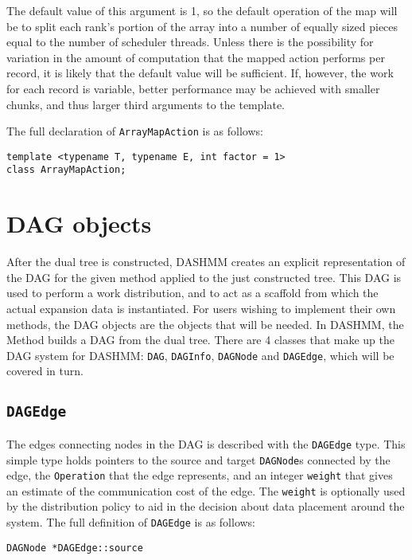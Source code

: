 The default value of this argument is 1, so the default operation of
the map will be to split each rank's portion of the array into a number of
equally sized pieces equal to the number of scheduler threads. Unless there is
the possibility for variation in the amount of computation that the mapped
action performs per record, it is likely that the default value will be
sufficient. If, however, the work for each record is variable, better
performance may be achieved with smaller chunks, and thus larger third arguments
to the template.

The full declaration of \texttt{ArrayMapAction} is as follows:


\begin{lstlisting}
template <typename T, typename E, int factor = 1>
class ArrayMapAction;
\end{lstlisting}



\section{DAG objects}

After the dual tree is constructed, DASHMM creates an explicit representation
of the DAG for the given method applied to the just constructed tree. This DAG
is used to perform a work distribution, and to act as a scaffold from which
the actual expansion data is instantiated. For users wishing to implement
their own methods, the DAG objects are the objects that will be needed. In
DASHMM, the Method builds a DAG from the dual tree. There are 4 classes that
make up the DAG system for DASHMM: \texttt{DAG}, \texttt{DAGInfo},
\texttt{DAGNode} and \texttt{DAGEdge}, which will be covered in turn.

\subsection{\texttt{DAGEdge}}

The edges connecting nodes in the DAG is described with the \texttt{DAGEdge}
type. This simple type holds pointers to the source and target
\texttt{DAGNode}s connected by the edge, the \texttt{Operation} that the edge
represents, and an integer \texttt{weight} that gives an estimate of the
communication cost of the edge. The \texttt{weight} is optionally used by the
distribution policy to aid in the decision about data placement around the
system. The full definition of \texttt{DAGEdge} is as follows:

\begin{lstlisting}
DAGNode *DAGEdge::source
\end{lstlisting}



